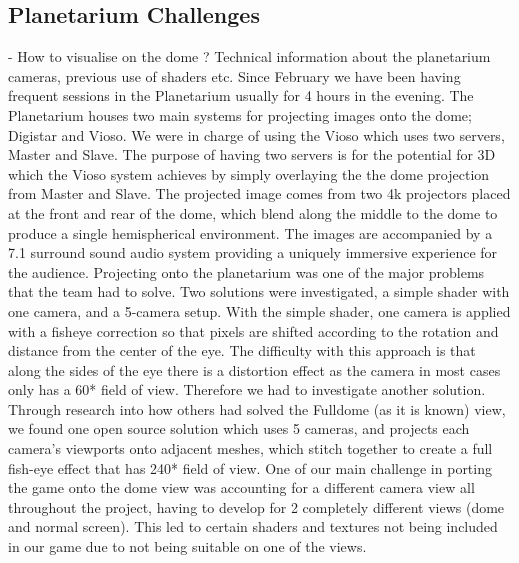\documentclass[11pt,a4paper]{article}
\begin{document}
    \pagebreak
    \subsection{Planetarium Challenges}
     - How to visualise on the dome ? Technical information about the planetarium cameras, previous use of shaders etc.
     Since February we have been having frequent sessions in the Planetarium usually for 4 hours in the evening. The Planetarium houses two main systems for projecting images onto the dome; Digistar and Vioso. We were in charge of using the Vioso which uses two servers, Master and Slave. The purpose of having two servers is for the potential for 3D which the Vioso system achieves by simply overlaying the the dome projection from Master and Slave.
     The projected image comes from two 4k projectors placed at the front and rear of the dome, which blend along the middle to the dome to produce a single hemispherical environment. The images are accompanied by a 7.1 surround sound audio system providing a uniquely immersive experience for the audience. 
     Projecting onto the planetarium was one of the major problems that the team had to solve. Two solutions were investigated, a simple shader with one camera, and a 5-camera setup. 
     With the simple shader, one camera is applied with a fisheye correction so that pixels are shifted according to the rotation and distance from the center of the eye. The difficulty with this approach is that along the sides of the eye there is a distortion effect as the camera in most cases only has a 60* field of view. Therefore we had to investigate another solution.
     Through research into how others had solved the Fulldome (as it is known) view, we found one open source solution which uses 5 cameras, and projects each camera's viewports onto adjacent meshes, which stitch together to create a full fish-eye effect that has 240* field of view.
     One of our main challenge in porting the game onto the dome view was accounting for a different camera view all throughout the project, having to develop for 2 completely different views (dome and normal screen). This led to certain shaders and textures not being included in our game due to not being suitable on one of the views.

     \pagebreak
\end{document}
